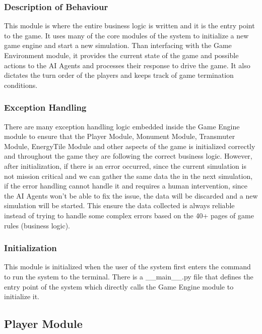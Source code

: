 \documentclass[12pt, titlepage]{article}
\begin{document}
\subsubsection{Description of Behaviour}
This module is where the entire business logic is written and it is the entry point to the game. It uses many of the core modules of the system to initialize a new game engine and start a new simulation. Than interfacing with the Game Environment module, it provides the current state of the game and possible actions to the AI Agents and processes their response to drive the game. It also dictates the turn order of the players and keeps track of game termination conditions.

\subsubsection{Exception Handling}
There are many exception handling logic embedded inside the Game Engine module to ensure that the Player Module, Monument Module, Transmuter Module, EnergyTile Module and other aspects of the game is initialized correctly and throughout the game they are following the correct business logic. However, after initialization, if there is an error occurred, since the current simulation is not mission critical and we can gather the same data the in the next simulation, if the error handling cannot handle it and requires a human intervention, since the AI Agents won't be able to fix the issue, the data will be discarded and a new simulation will be started. This ensure the data collected is always reliable instead of trying to handle some complex errors based on the 40+ pages of game rules (business logic).

\subsubsection{Initialization}
This module is initialized when the user of the system first enters the command to run the system to the terminal. There is a \_\_main\_\_.py file that defines the entry point of the system which directly calls the Game Engine module to initialize it.

\newpage
\subsection{Player Module}
\end{document}
